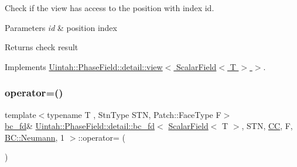 Check if the view has access to the position with index id. 


\begin{DoxyParams}{Parameters}
{\em id} & position index \\
\hline
\end{DoxyParams}
\begin{DoxyReturn}{Returns}
check result 
\end{DoxyReturn}


Implements \hyperlink{classUintah_1_1PhaseField_1_1detail_1_1view_3_01ScalarField_3_01T_01_4_01_4_a9a950513dacd6468658436b737c3314f}{Uintah\+::\+Phase\+Field\+::detail\+::view$<$ Scalar\+Field$<$ T $>$ $>$}.

\mbox{\label{classUintah_1_1PhaseField_1_1detail_1_1bc__fd_3_01ScalarField_3_01T_01_4_00_01STN_00_01CC_00_01F_00_01BC_1_1Neumann_00_011_01_4_a22efd45a0b2f5dd7c2016c3bea10f2fe}} 
\subsubsection{\texorpdfstring{operator=()}{operator=()}}
{\footnotesize\ttfamily template$<$typename T , Stn\+Type S\+TN, Patch\+::\+Face\+Type F$>$ \\
\hyperlink{classUintah_1_1PhaseField_1_1detail_1_1bc__fd}{bc\+\_\+fd}\& \hyperlink{classUintah_1_1PhaseField_1_1detail_1_1bc__fd}{Uintah\+::\+Phase\+Field\+::detail\+::bc\+\_\+fd}$<$ \hyperlink{structUintah_1_1PhaseField_1_1ScalarField}{Scalar\+Field}$<$ T $>$, S\+TN, \hyperlink{namespaceUintah_1_1PhaseField_a33d355affda78a83f45755ba8388cedda22303704507d024d1d6508ed9859a85a}{CC}, F, \hyperlink{namespaceUintah_1_1PhaseField_a148fba372aa3be96fd6eede7a2fa10b5ab8537a769dbc90cb1762215441212152}{B\+C\+::\+Neumann}, 1 $>$\+::operator= (\begin{DoxyParamCaption}\item[{const \hyperlink{classUintah_1_1PhaseField_1_1detail_1_1bc__fd}{bc\+\_\+fd}$<$ \hyperlink{structUintah_1_1PhaseField_1_1ScalarField}{Scalar\+Field}$<$ T $>$, S\+TN, \hyperlink{namespaceUintah_1_1PhaseField_a33d355affda78a83f45755ba8388cedda22303704507d024d1d6508ed9859a85a}{CC}, F, \hyperlink{namespaceUintah_1_1PhaseField_a148fba372aa3be96fd6eede7a2fa10b5ab8537a769dbc90cb1762215441212152}{B\+C\+::\+Neumann}, 1 $>$ \&}]{ }\end{DoxyParamCaption})\hspace{0.3cm}{\ttfamily [delete]}}



